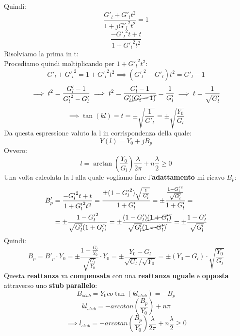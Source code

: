 Quindi:
\begin{equation*}
    \frac{G'_l + G'_l t^2}{1 + j {G'_l}^2 t^2} = 1
\end{equation*}
\begin{equation*}
    \frac{- {G'_l}^2 t +t}{1 + {G'_l}^2 t^2}
\end{equation*}
Risolviamo la prima in t:\\ 
Procediamo quindi moltiplicando per $1 + {G'_l}^2 t^2$:
\begin{equation*}
    G'_l + {G'_l}^2 = 1 + {G'_l}^2 t^2 \implies ( {G'_l}^2 - G'_l) t^2 = G'_l -1
\end{equation*}
\begin{equation*}
    \implies t^2 = \frac{G'_l -1}{{G'_l}^2 - G'_l} \implies t^2 = \frac{G'_l -1}{G'_l\cancel{({G'_l} - 1)}} = \frac{1}{G'_l} \implies t = \frac{1}{\sqrt{G'_l}}
\end{equation*}
\begin{equation*}
    \implies \tan(kl) = t = \pm \sqrt{\frac{1}{{G'_l}}} = \pm \sqrt{\frac{Y_0}{G_l}}
\end{equation*}
Da questa espressione valuto la l in corrispondenza della quale:
\begin{equation*}
    Y(l) = Y_0 + j B_p
\end{equation*}
Ovvero:
\begin{equation*}
    l = \arctan\left(\frac{Y_0}{G_l}\right) \frac{\lambda}{2\pi} + n \frac{\lambda}{2} \geq 0
\end{equation*}
Una volta calcolata la l alla quale vogliamo fare l'\textbf{adattamento} mi ricavo $B_p$:
\begin{equation*}
    \begin{aligned}
    B'_p &= \frac{- {G'_l}^2 t +t}{1 + {G'_l}^2 t^2} = \frac{\pm (1 - {G'_l}^2) \sqrt{\frac{1}{G'_l}}}{1 + G'_l} = \pm \frac{\frac{1 - {G'_l}^2}{\sqrt{G'_l}}}{1 + G'_l} =\\
    &= \pm \frac{1 -{G'_l}^2 }{\sqrt{G'_l} (1 +{G'_l})} = \pm \frac{(1 -{G'_l})\cancel{(1 +{G'_l})}}{\sqrt{G'_l} \cancel{(1 +{G'_l})}} = \pm \frac{1 - {G'_l}}{\sqrt{G'_l}}
    \end{aligned}
\end{equation*}
Quindi:
\begin{equation*}
    B_p = B'_p \cdot Y_0 = \pm \frac{1 - \frac{G_l}{Y_0}}{\sqrt{\frac{G_l}{Y_0}}} \cdot Y_0 = \pm \frac{Y_0 - G_l}{\sqrt{G_l} / \sqrt{Y_0}} = \pm (Y_0 - G_l) \cdot \sqrt{\frac{Y_0}{G_l}}
\end{equation*}
Questa \textbf{reattanza} va \textbf{compensata} con una \textbf{reattanza} \textbf{uguale} e \textbf{opposta} attraverso uno \textbf{stub} \textbf{parallelo}:
\begin{equation*}
    B_{stub} = Y_0 co\tan(kl_{stub}) = - B_p
\end{equation*}
\begin{equation*}
    kl_{stub} = -arcotan\left(\frac{B_p}{Y_0}\right) + n\pi
\end{equation*}
\begin{equation*}
   \implies l_{stub} = -arcotan\left(\frac{B_p}{Y_0}\right) \frac{\lambda}{2\pi} + n \frac{\lambda}{2} \geq 0
\end{equation*}


